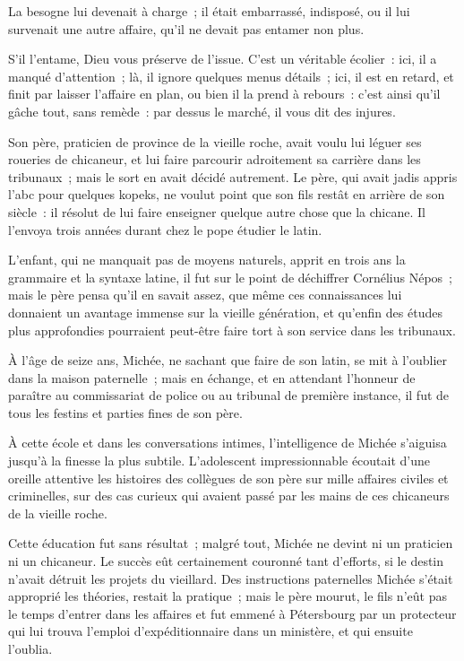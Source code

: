 \documentclass[french,twoside]{book} %
\begin{document}
La besogne lui devenait à charge ; il était embarrassé, indisposé, ou il lui survenait une autre affaire, qu’il ne devait pas entamer non plus.\par
S’il l’entame, Dieu vous préserve de l’issue. C’est un véritable écolier : ici, il a manqué d’attention ; là, il ignore quelques menus détails ; ici, il est en retard, et finit par laisser l’affaire en plan, ou bien il la prend à rebours : c’est ainsi qu’il gâche tout, sans remède : par dessus le marché, il vous dit des injures.\par
Son père, praticien de province de la vieille roche, avait voulu lui léguer ses roueries de chicaneur, et lui faire parcourir adroitement sa carrière dans les tribunaux ; mais le sort en avait décidé autrement. Le père, qui avait jadis appris l’abc pour quelques kopeks, ne voulut point que son fils restât en arrière de son siècle : il résolut de lui faire enseigner quelque autre chose que la chicane. Il l’envoya trois années durant chez le pope étudier le latin.\par
L’enfant, qui ne manquait pas de moyens naturels, apprit en trois ans la grammaire et la syntaxe latine, il fut sur le point de déchiffrer Cornélius Népos ; mais le père pensa qu’il en savait assez, que même ces connaissances lui donnaient un avantage immense sur la vieille génération, et qu’enfin des études plus approfondies pourraient peut-être faire tort à son service dans les tribunaux.\par
À l’âge de seize ans, Michée, ne sachant que faire de son latin, se mit à l’oublier dans la maison paternelle ; mais en échange, et en attendant l’honneur de paraître au commissariat de police ou au tribunal de première instance, il fut de tous les festins et parties fines de son père.\par
À cette école et dans les conversations intimes, l’intelligence de Michée s’aiguisa jusqu’à la finesse la plus subtile. L’adolescent impressionnable écoutait d’une oreille attentive les histoires des collègues de son père sur mille affaires civiles et criminelles, sur des cas curieux qui avaient passé par les mains de ces chicaneurs de la vieille roche.\par
Cette éducation fut sans résultat ; malgré tout, Michée ne devint ni un praticien ni un chicaneur. Le succès eût certainement couronné tant d’efforts, si le destin n’avait détruit les projets du vieillard. Des instructions paternelles Michée s’était approprié les théories, restait la pratique ; mais le père mourut, le fils n’eût pas le temps d’entrer dans les affaires et fut emmené à Pétersbourg par un protecteur qui lui trouva l’emploi d’expéditionnaire dans un ministère, et qui ensuite l’oublia.\par
\end{document}

